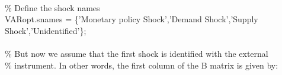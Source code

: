 \hspace{1mm}\hspace{5mm} \hspace{5mm} \hspace{5mm} \hspace{5mm} \hspace{5mm}  \\ 
\hspace{1mm}\hspace{5mm} \hspace{5mm} \hspace{5mm} \hspace{5mm} \hspace{5mm} \textcolor{matlabgreen}{\% Define the shock names }\\ 
\hspace{1mm}\hspace{5mm} \hspace{5mm} \hspace{5mm} \hspace{5mm} \hspace{5mm} VARopt.snames = \{\textcolor{matlabpurple}{'Monetary policy Shock'},\textcolor{matlabpurple}{'Demand Shock'},\textcolor{matlabpurple}{'Supply Shock'},\textcolor{matlabpurple}{'Unidentified'}\}; \\ 
\hspace{1mm}\hspace{5mm} \hspace{5mm} \hspace{5mm} \hspace{5mm} \hspace{5mm}  \\ 
\hspace{1mm}\hspace{5mm} \hspace{5mm} \hspace{5mm} \hspace{5mm} \hspace{5mm} \textcolor{matlabgreen}{\% But now we assume that the first shock is identified with the external  }\\ 
\hspace{1mm}\hspace{5mm} \hspace{5mm} \hspace{5mm} \hspace{5mm} \hspace{5mm} \textcolor{matlabgreen}{\% instrument. In other words, the first column of the B matrix is given by: }\\ 
